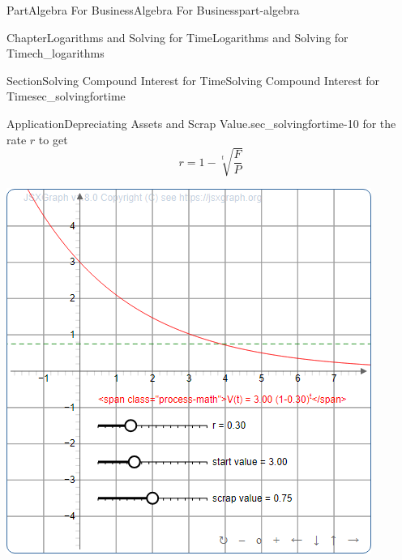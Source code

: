 \documentclass[oneside,10pt,]{tufte-book}
\numberwithin{equation}{chapter}
\begin{document}
\begin{partptx}{Part}{Algebra For Business}{}{Algebra For Business}{}{}{part-algebra}
\begin{chapterptx}{Chapter}{Logarithms and Solving for Time}{}{Logarithms and Solving for Time}{}{}{ch_logarithms}
\begin{sectionptx}{Section}{Solving Compound Interest for Time}{}{Solving Compound Interest for Time}{}{}{sec_solvingfortime}
\begin{insight}{Application}{Depreciating Assets and Scrap Value.}{sec_solvingfortime-10}
for the rate \(r\) to get%
\begin{equation*}
r = 1- \sqrt[t]{\frac{F}{P}}
\end{equation*}
%
\end{insight}
\begin{sidebyside}{2}{0.075}{0.075}{0.17}%
\begin{sbspanel}{0.47}%
\includegraphics[width=\linewidth]{generated/preview/interactive_depreciation-preview.png}
\end{sbspanel}%
\begin{sbspanel}{0.21}%

\end{sbspanel}
\end{sidebyside}
\end{sectionptx}
\end{chapterptx}
\end{partptx}
\end{document}
